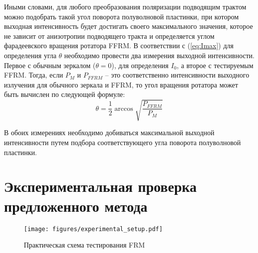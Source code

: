 \documentclass{article}
\begin{document}
Иными словами, для любого преобразования поляризации подводящим трактом можно подобрать такой угол поворота полуволновой пластинки, при котором выходная интенсивность будет достигать своего максимального значения, которое не зависит от анизотропии подводящего тракта и определяется углом фарадеевского вращения ротатора FFRM.
В соответствии с (\ref{eq:Imax}) для определения угла $\theta$ необходимо провести два измерения выходной интенсивности.
Первое с обычным зеркалом ($\theta=0$), для определения $I_0$, а второе с тестируемым FFRM.
Тогда, если $P_M$ и $P_{FFRM}$ – это соответственно интенсивности выходного излучения для обычного зеркала и FFRM, то угол вращения ротатора может быть вычислен по следующей формуле:
\begin{equation}
	\label{eq:theta}
	\theta=\frac{1}{2}\arccos\sqrt{\frac{P_{FFRM}}{P_M}}
\end{equation}

В обоих измерениях необходимо добиваться максимальной выходной интенсивности путем подбора соответствующего угла поворота полуволновой пластинки.

\section{Экспериментальная проверка предложенного метода}
\begin{figure}[b]
	\centering
	\texttt{[image: figures/experimental\_setup.pdf]}
	\caption{Практическая схема тестирования FRM}
	\label{fig:experimantalScheme}
\end{figure}
\end{document}
